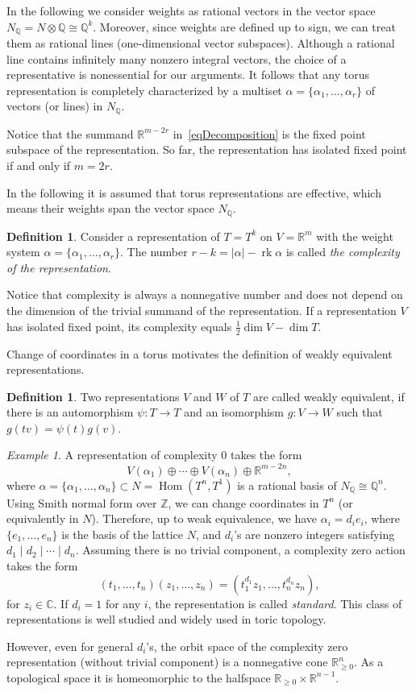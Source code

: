 \documentclass[english,12pt,oneside]{amsproc}
\DeclareMathOperator{\Hom}{Hom} \DeclareMathOperator{\rk}{rk}
\newcommand{\Zo}{\mathbb{Z}}
\newcommand{\Ro}{\mathbb{R}}
\newcommand{\Rg}{\mathbb{R}_{\geqslant 0}}
\newcommand{\Co}{\mathbb{C}}
\newcommand{\Qo}{\mathbb{Q}}
\newcommand{\Nq}{N_\Qo}
\newcounter{stmcounter}[section]
\numberwithin{equation}{section}
\theoremstyle{plain}
\theoremstyle{definition}
\newtheorem{defin}[stmcounter]{Definition}
\theoremstyle{remark}
\newtheorem{ex}[stmcounter]{Example}
\begin{document}
In the following we consider weights as rational vectors in the vector space $\Nq=N\otimes\Qo\cong\Qo^k$. Moreover, since weights are defined up to sign, we can treat them as rational lines (one-dimensional vector subspaces). Although a rational line contains infinitely many nonzero integral vectors, the choice of a representative is nonessential for our arguments. It follows that any torus representation is completely characterized by a multiset $\alpha=\{\alpha_1,\ldots,\alpha_r\}$ of vectors (or lines) in $\Nq$.

Notice that the summand $\Ro^{m-2r}$ in~\eqref{eqDecomposition} is the fixed point subspace of the representation. So far, the representation has isolated fixed point if and only if $m=2r$.

In the following it is assumed that torus representations are effective, which means their weights span the vector space $\Nq$.

\begin{defin}\label{definComplexity}
Consider a representation of $T=T^k$ on $V=\Ro^m$ with the weight system $\alpha=\{\alpha_1,\ldots,\alpha_r\}$. The number $r-k=|\alpha|-\rk\alpha$ is called \emph{the complexity of the representation}.
\end{defin}

Notice that complexity is always a nonnegative number and does not depend on the dimension of the trivial summand of the representation. If a representation $V$ has isolated fixed point, its complexity equals $\frac{1}{2}\dim V-\dim T$.

Change of coordinates in a torus motivates the definition of weakly equivalent representations.

\begin{defin}
Two representations $V$ and $W$ of $T$ are called weakly equivalent, if there is an automorphism $\psi\colon T\to T$ and an isomorphism $g\colon V\to W$ such that $g(tv)=\psi(t)g(v)$.
\end{defin}

\begin{ex}\label{exCompl0}
A representation of complexity 0 takes the form
\[
V(\alpha_1)\oplus\cdots\oplus V(\alpha_n)\oplus \Ro^{m-2n},
\]
where $\alpha=\{\alpha_1,\ldots,\alpha_n\}\subset N=\Hom(T^n,T^1)$ is a rational basis of $\Nq\cong\Qo^n$. Using Smith normal form over $\Zo$, we can change coordinates in $T^n$ (or equivalently in $N$). Therefore, up to weak equivalence, we have $\alpha_i=d_ie_i$, where $\{e_1,\ldots,e_n\}$ is the basis of the lattice $N$, and $d_i$'s are nonzero integers satisfying $d_1\mid d_2\mid\cdots\mid d_n$. Assuming there is no trivial component, a complexity zero action takes the form
\[
(t_1,\ldots,t_n)(z_1,\ldots,z_n)=(t_1^{d_1}z_1,\ldots,t_n^{d_n}z_n),
\]
for $z_i\in\Co$. If $d_i=1$ for any $i$, the representation is called \emph{standard}. This class of representations is well studied and widely used in toric topology.

However, even for general $d_i$'s, the orbit space of the complexity zero representation (without trivial component) is a nonnegative cone $\Rg^n$. As a topological space it is homeomorphic to the halfspace $\Rg\times\Ro^{n-1}$.
\end{ex}
\end{document}
